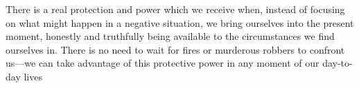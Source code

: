 There is a real protection and power which we receive when, instead of 
focusing on what might happen in a negative situation, we bring 
ourselves into the present moment, honestly and truthfully being 
available to the circumstances we find ourselves in. There is no need 
to wait for fires or murderous robbers to confront us---we can take 
advantage of this protective power in any moment of our day-to-day lives

